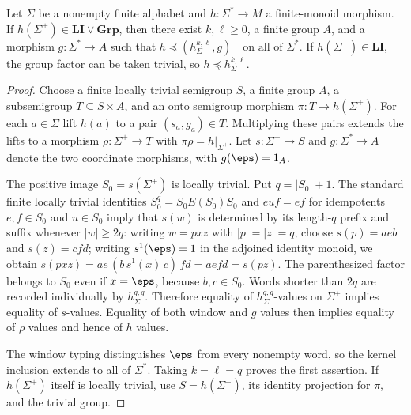 \begin{lemma}
\label{lem:mcfg-li-group-window}
Let $\Sigma$ be a nonempty finite alphabet and
$h:\Sigma^*\to M$ a finite-monoid morphism.  If
$h(\Sigma^+)\in\mathbf{LI}\vee\mathbf{Grp}$, then
there exist $k,\ell\ge0$, a finite group $A$, and a
morphism $g:\Sigma^*\to A$ such that
\(h\preceq (h_\Sigma^{k,\ell},g)
 \quad\text{on all of }\Sigma^*\).
If $h(\Sigma^+)\in\mathbf{LI}$, the group factor can
be taken trivial, so $h\preceq h_\Sigma^{k,\ell}$.
\end{lemma}
\begin{proof}
Choose a finite locally trivial semigroup $S$, a finite group
$A$, a subsemigroup $T\subseteq S\times A$, and an onto
semigroup morphism $\pi:T\to h(\Sigma^+)$.  For each
$a\in\Sigma$ lift $h(a)$ to a pair $(s_a,g_a)\in T$.
Multiplying these pairs extends the lifts to a morphism
$\rho:\Sigma^+\to T$ with $\pi\rho=h|_{\Sigma^+}$.
Let $s:\Sigma^+\to S$ and $g:\Sigma^*\to A$ denote the two
coordinate morphisms, with $g(\eps)=1_A$.

The positive image $S_0=s(\Sigma^+)$ is locally trivial.
Put $q=|S_0|+1$.  The standard finite locally trivial
identities $S_0^q=S_0E(S_0)S_0$ and
$euf=ef$ for idempotents $e,f\in S_0$ and $u\in S_0$
\cite{Pin1986,kuriyamaCFG}
imply that $s(w)$ is determined by its length-$q$
prefix and suffix whenever $|w|\ge2q$:
writing $w=pxz$ with $|p|=|z|=q$,
choose $s(p)=aeb$ and $s(z)=cfd$; writing
$s^1(\eps)=1$ in the adjoined identity monoid, we obtain
\(s(pxz)=ae\,(b\,s^1(x)\,c)\,fd=aefd=s(pz)\).
The parenthesized factor belongs to $S_0$ even if $x=\eps$,
because $b,c\in S_0$.  Words shorter than $2q$
are recorded individually by $h_\Sigma^{q,q}$.
Therefore equality of $h_\Sigma^{q,q}$-values on
$\Sigma^+$ implies equality of $s$-values.  Equality of
both window and $g$ values then implies equality of
$\rho$ values and hence of $h$ values.

The window typing distinguishes $\eps$ from every nonempty
word, so the kernel inclusion extends to all of $\Sigma^*$.
Taking $k=\ell=q$ proves the first assertion.
If $h(\Sigma^+)$ itself is locally trivial, use
$S=h(\Sigma^+)$, its identity projection for $\pi$,
and the trivial group.
\end{proof}

